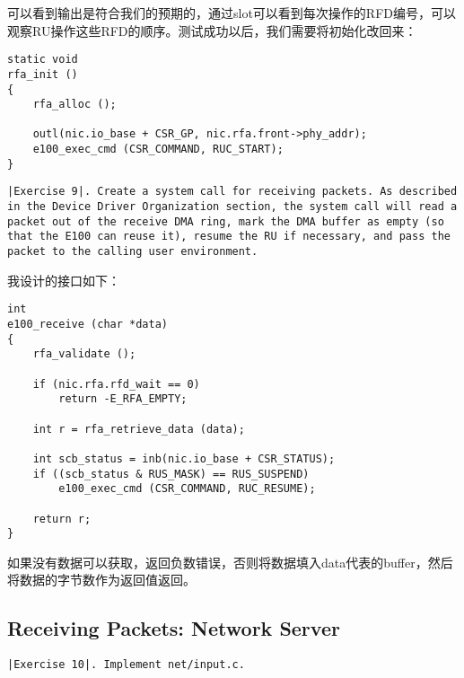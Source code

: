 \documentclass{article}
\begin{document}
\begin{CJK*}{UTF8}{gkai}
可以看到输出是符合我们的预期的，通过slot可以看到每次操作的RFD编号，可以观察RU操作这些RFD的顺序。测试成功以后，我们需要将初始化改回来：

\begin{lstlisting}[style=ccode, title={\scriptsize \ttfamily \bfseries kern/e100.c}]
static void
rfa_init () 
{
    rfa_alloc ();

    outl(nic.io_base + CSR_GP, nic.rfa.front->phy_addr);
    e100_exec_cmd (CSR_COMMAND, RUC_START); 
}
\end{lstlisting}

\newpage

\begin{lstlisting}[style=exercise]
|Exercise 9|. Create a system call for receiving packets. As described in the Device Driver Organization section, the system call will read a packet out of the receive DMA ring, mark the DMA buffer as empty (so that the E100 can reuse it), resume the RU if necessary, and pass the packet to the calling user environment.
\end{lstlisting}

我设计的接口如下：



\begin{lstlisting}[style=ccode, title={\scriptsize \ttfamily \bfseries kern/e100.c: e100\_receive()}]
int 
e100_receive (char *data)
{
    rfa_validate ();

    if (nic.rfa.rfd_wait == 0)
        return -E_RFA_EMPTY;

    int r = rfa_retrieve_data (data);
    
    int scb_status = inb(nic.io_base + CSR_STATUS);
    if ((scb_status & RUS_MASK) == RUS_SUSPEND)
        e100_exec_cmd (CSR_COMMAND, RUC_RESUME); 

    return r;
}
\end{lstlisting}

如果没有数据可以获取，返回负数错误，否则将数据填入data代表的buffer，然后将数据的字节数作为返回值返回。


\subsection{Receiving Packets: Network Server}



\begin{lstlisting}[style=exercise]
|Exercise 10|. Implement net/input.c.
\end{lstlisting}


\end{CJK*}
\end{document}
